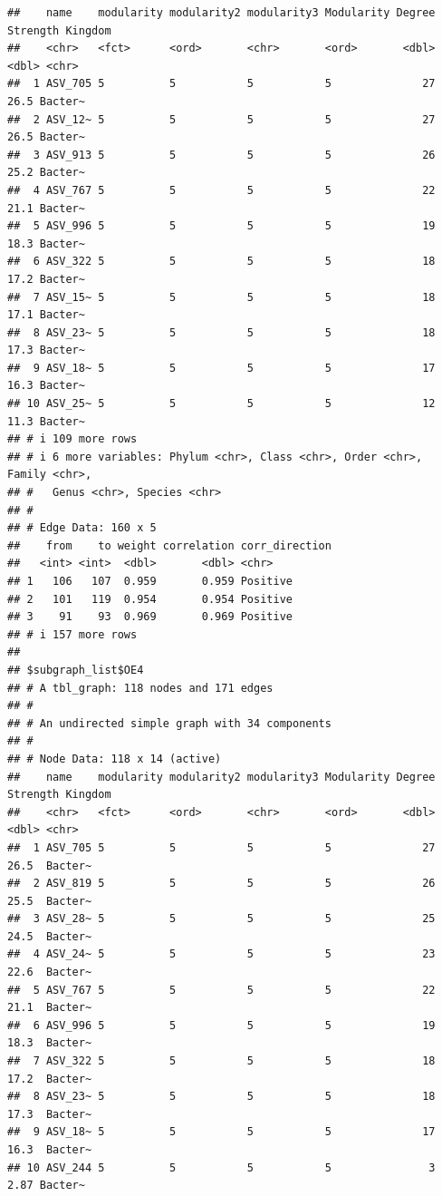 \documentclass[
]{book}
\begin{document}
\begin{verbatim}
##    name    modularity modularity2 modularity3 Modularity Degree Strength Kingdom
##    <chr>   <fct>      <ord>       <chr>       <ord>       <dbl>    <dbl> <chr>  
##  1 ASV_705 5          5           5           5              27     26.5 Bacter~
##  2 ASV_12~ 5          5           5           5              27     26.5 Bacter~
##  3 ASV_913 5          5           5           5              26     25.2 Bacter~
##  4 ASV_767 5          5           5           5              22     21.1 Bacter~
##  5 ASV_996 5          5           5           5              19     18.3 Bacter~
##  6 ASV_322 5          5           5           5              18     17.2 Bacter~
##  7 ASV_15~ 5          5           5           5              18     17.1 Bacter~
##  8 ASV_23~ 5          5           5           5              18     17.3 Bacter~
##  9 ASV_18~ 5          5           5           5              17     16.3 Bacter~
## 10 ASV_25~ 5          5           5           5              12     11.3 Bacter~
## # i 109 more rows
## # i 6 more variables: Phylum <chr>, Class <chr>, Order <chr>, Family <chr>,
## #   Genus <chr>, Species <chr>
## #
## # Edge Data: 160 x 5
##    from    to weight correlation corr_direction
##   <int> <int>  <dbl>       <dbl> <chr>         
## 1   106   107  0.959       0.959 Positive      
## 2   101   119  0.954       0.954 Positive      
## 3    91    93  0.969       0.969 Positive      
## # i 157 more rows
## 
## $subgraph_list$OE4
## # A tbl_graph: 118 nodes and 171 edges
## #
## # An undirected simple graph with 34 components
## #
## # Node Data: 118 x 14 (active)
##    name    modularity modularity2 modularity3 Modularity Degree Strength Kingdom
##    <chr>   <fct>      <ord>       <chr>       <ord>       <dbl>    <dbl> <chr>  
##  1 ASV_705 5          5           5           5              27    26.5  Bacter~
##  2 ASV_819 5          5           5           5              26    25.5  Bacter~
##  3 ASV_28~ 5          5           5           5              25    24.5  Bacter~
##  4 ASV_24~ 5          5           5           5              23    22.6  Bacter~
##  5 ASV_767 5          5           5           5              22    21.1  Bacter~
##  6 ASV_996 5          5           5           5              19    18.3  Bacter~
##  7 ASV_322 5          5           5           5              18    17.2  Bacter~
##  8 ASV_23~ 5          5           5           5              18    17.3  Bacter~
##  9 ASV_18~ 5          5           5           5              17    16.3  Bacter~
## 10 ASV_244 5          5           5           5               3     2.87 Bacter~

\end{verbatim}
\end{document}
